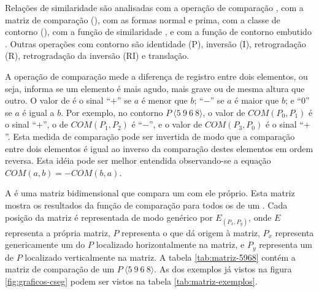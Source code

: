 Relações de similaridade \cite{marvin.ea87:relating} são analisadas
com a operação de comparação , com a matriz de comparação
(), com as formas normal e prima, com a classe de
contorno (), com a função de similaridade , e
com a função de contorno embutido . Outras operações com
contorno são identidade (P), inversão (I), retrogradação (R),
retrogradação da inversão (RI) e translação.

A operação de comparação  mede a diferença de registro
entre dois elementos, ou seja, informa se um elemento é mais agudo,
mais grave ou de mesma altura que outro. O valor de  é o
sinal ``$+$'' se $a$ é menor que $b$; ``$-$'' se $a$ é maior que $b$;
e ``$0$'' se $a$ é igual a $b$. Por exemplo, no contorno
$P\:\langle5\:9\:6\:8\rangle$, o valor de $COM(P_0,P_1)$ é o sinal
``$+$'', o de $COM(P_1,P_2)$ é ``$-$'', e o valor de $COM(P_3,P_0)$ é
o sinal ``$+$''. Esta medida de comparação pode ser invertida de modo
que a comparação entre dois elementos é igual ao inverso da comparação
destes elementos em ordem reversa. Esta idéia pode ser melhor
entendida observando-se a equação $COM(a,b)=-COM(b,a)$.

A  é uma matriz bidimensional que compara um
 com ele próprio. Esta matriz mostra os resultados da
função de comparação  para todos os  de um
. Cada posição da matriz é representada de modo genérico
por $E_(P_x,P_y)$, onde $E$ representa a própria matriz, $P$
representa o  que dá origem à matriz, $P_x$ representa
genericamente um  do  $P$ localizado
horizontalmente na matriz, e $P_y$ representa um  de
$P$ localizado verticalmente na matriz. A tabela \ref{tab:matriz-5968}
contém a matriz de comparação de um 
$P\:\langle5\:9\:6\:8\rangle$. As  dos exemplos já
vistos na figura \ref{fig:graficos-cseg} podem ser vistos na tabela
\ref{tab:matriz-exemplos}.

